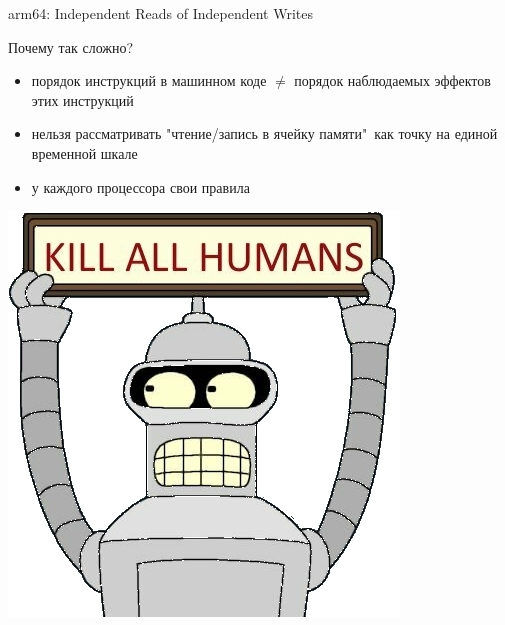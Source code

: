 \begin{frame}[fragile]{arm64: Independent Reads of Independent Writes}
\pause


 \end{frame}

 
 
 \begin{frame}[t]{Почему так сложно?}
 
 \begin{itemize}
  \item порядок инструкций в машинном коде $\neq$ порядок наблюдаемых эффектов этих инструкций 
  \pause
  \item нельзя рассматривать "чтение/запись в ячейку памяти"\ как точку на единой временной шкале
  \pause
  \item у каждого процессора свои правила
 \end{itemize}
 
 \pause

 \begin{center}
 \includegraphics[width=.3\textwidth]{production/bender-kill.jpg}
 \end{center}

 \end{frame}


